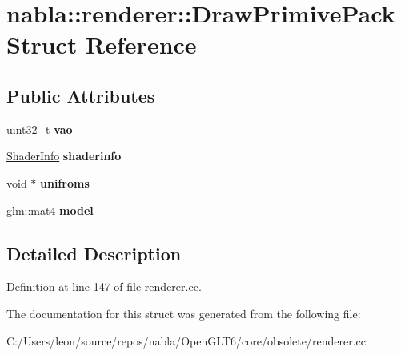 \hypertarget{structnabla_1_1renderer_1_1_draw_primive_pack}{}\section{nabla\+::renderer\+::Draw\+Primive\+Pack Struct Reference}
\label{structnabla_1_1renderer_1_1_draw_primive_pack}
\subsection*{Public Attributes}
\begin{DoxyCompactItemize}
\item 
\mbox{\label{structnabla_1_1renderer_1_1_draw_primive_pack_a955142a7259380f26e8d75cb17b1b156}} 
uint32\+\_\+t {\bfseries vao}
\item 
\mbox{\label{structnabla_1_1renderer_1_1_draw_primive_pack_ac523e0be3a9e771d0cfb847923fa2186}} 
\mbox{\hyperlink{structnabla_1_1renderer_1_1_shader_info}{Shader\+Info}} {\bfseries shaderinfo}
\item 
\mbox{\label{structnabla_1_1renderer_1_1_draw_primive_pack_ac25db0595f9cdf4cf614bf7e36d1036a}} 
void $\ast$ {\bfseries unifroms}
\item 
\mbox{\label{structnabla_1_1renderer_1_1_draw_primive_pack_a3607a2ce0d3e4780e4daba362ec49c6e}} 
glm\+::mat4 {\bfseries model}
\end{DoxyCompactItemize}


\subsection{Detailed Description}


Definition at line 147 of file renderer.\+cc.



The documentation for this struct was generated from the following file\+:\begin{DoxyCompactItemize}
\item 
C\+:/\+Users/leon/source/repos/nabla/\+Open\+G\+L\+T6/core/obsolete/renderer.\+cc\end{DoxyCompactItemize}
